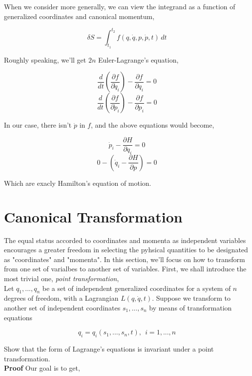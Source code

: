 \documentclass[12pt]{article}
\begin{document}
When we consider more generally, we can view the integrand as a function of generalized coordinates and canonical momentum,

\begin{center}
    \[ \delta S = \int_{t_1}^{t_2} f(q, \dot{q}, p, \dot{p}, t) \,dt \]
\end{center}

Roughly speaking, we'll get $2n$ Euler-Lagrange's equation,

\begin{center}
    \[ \frac{d}{dt} \left(\frac{\partial f}{\partial \dot{q}_i}\right)  - \frac{\partial f}{\partial q_i} = 0 \]
    \[ \frac{d}{dt} \left(\frac{\partial f}{\partial \dot{p}_i}\right)  - \frac{\partial f}{\partial p_i} = 0 \]
\end{center}

In our case, there isn't $\dot{p}$ in $f$, and the above equations would become,

\begin{center}
    \[ \dot{p}_i - \frac{\partial H}{\partial q_i} = 0 \]
    \[ 0 - \left( \dot{q}_i - \frac{\partial H}{\partial p} \right) = 0 \]
\end{center}

Which are exacly Hamilton's equation of motion.

\section{Canonical Transformation}

The equal status accorded to coordinates and momenta as independent variables encourages a greater freedom in selecting the pyhsical quantities to be designated as "coordinates" and "momenta". In this section, we'll focus on how to transform from one set of varialbes to another set of variables. First, we shall introduce the most trivial one, \textit{point transformation},
\\
Let $q_1, ..., q_n$ be a set of independent generalized coordinates for a system of $n$ degrees of freedom, with a Lagrangian $L(q, \dot{q}, t)$. Suppose we transform to another set of independent coordinates $s_1, ..., s_n$ by means of transformation equations

\begin{center}
    \[ q_i = q_i(s_1, ... ,s_n, t),\ \  i = 1, ... ,n \]
\end{center}

Show that the form of Lagrange's equations is invariant under a point transformation.
\\
\indent \textbf{Proof } Our goal is to get,
\end{document}
